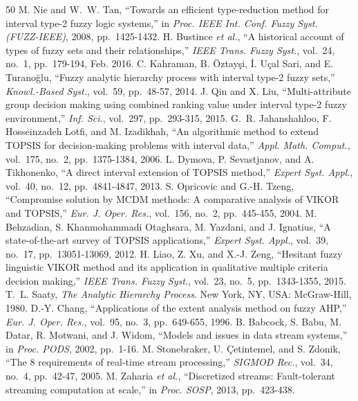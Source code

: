 \documentclass[journal,10pt,twocolumn]{IEEEtran}
\begin{document}
\begin{thebibliography}{50}
M. Nie and W.~W. Tan, ``Towards an efficient type-reduction method for interval type-2 fuzzy logic systems,'' in \emph{Proc. IEEE Int. Conf. Fuzzy Syst. (FUZZ-IEEE)}, 2008, pp.\ 1425-1432.
H. Bustince \emph{et al.}, ``A historical account of types of fuzzy sets and their relationships,'' \emph{IEEE Trans. Fuzzy Syst.}, vol.\ 24, no.\ 1, pp.\ 179-194, Feb. 2016.
C. Kahraman, B. \"Oztay\c{s}i, \.{I}. U\c{c}al Sari, and E. Turano\u{g}lu, ``Fuzzy analytic hierarchy process with interval type-2 fuzzy sets,'' \emph{Knowl.-Based Syst.}, vol.\ 59, pp.\ 48-57, 2014.
J. Qin and X. Liu, ``Multi-attribute group decision making using combined ranking value under interval type-2 fuzzy environment,'' \emph{Inf. Sci.}, vol.\ 297, pp.\ 293-315, 2015.
G.~R. Jahanshahloo, F. Hosseinzadeh Lotfi, and M. Izadikhah, ``An algorithmic method to extend TOPSIS for decision-making problems with interval data,'' \emph{Appl. Math. Comput.}, vol.\ 175, no.\ 2, pp.\ 1375-1384, 2006.
L. Dymova, P. Sevastjanov, and A. Tikhonenko, ``A direct interval extension of TOPSIS method,'' \emph{Expert Syst. Appl.}, vol.\ 40, no.\ 12, pp.\ 4841-4847, 2013.
S. Opricovic and G.-H. Tzeng, ``Compromise solution by MCDM methods: A comparative analysis of VIKOR and TOPSIS,'' \emph{Eur. J. Oper. Res.}, vol.\ 156, no.\ 2, pp.\ 445-455, 2004.
M. Behzadian, S. Khanmohammadi Otaghsara, M. Yazdani, and J. Ignatius, ``A state-of-the-art survey of TOPSIS applications,'' \emph{Expert Syst. Appl.}, vol.\ 39, no.\ 17, pp.\ 13051-13069, 2012.
H. Liao, Z. Xu, and X.-J. Zeng, ``Hesitant fuzzy linguistic VIKOR method and its application in qualitative multiple criteria decision making,'' \emph{IEEE Trans. Fuzzy Syst.}, vol.\ 23, no.\ 5, pp.\ 1343-1355, 2015.
T.~L. Saaty, \emph{The Analytic Hierarchy Process}. New York, NY, USA: McGraw-Hill, 1980.
D.-Y. Chang, ``Applications of the extent analysis method on fuzzy AHP,'' \emph{Eur. J. Oper. Res.}, vol.\ 95, no.\ 3, pp.\ 649-655, 1996.
B. Babcock, S. Babu, M. Datar, R. Motwani, and J. Widom, ``Models and issues in data stream systems,'' in \emph{Proc. PODS}, 2002, pp.\ 1-16.
M. Stonebraker, U. \c{C}etintemel, and S. Zdonik, ``The 8 requirements of real-time stream processing,'' \emph{SIGMOD Rec.}, vol.\ 34, no.\ 4, pp.\ 42-47, 2005.
M. Zaharia \emph{et al.}, ``Discretized streams: Fault-tolerant streaming computation at scale,'' in \emph{Proc. SOSP}, 2013, pp.\ 423-438.

\end{thebibliography}
\end{document}
